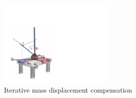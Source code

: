 \begin{figure}[!t]
	\centering
	\includegraphics[width=55mm]{./pictures/IterativeAlgorithm.pdf}
	\caption{Iterative mass displacement compensation}
	\label{fig:imassCom}
\end{figure}









